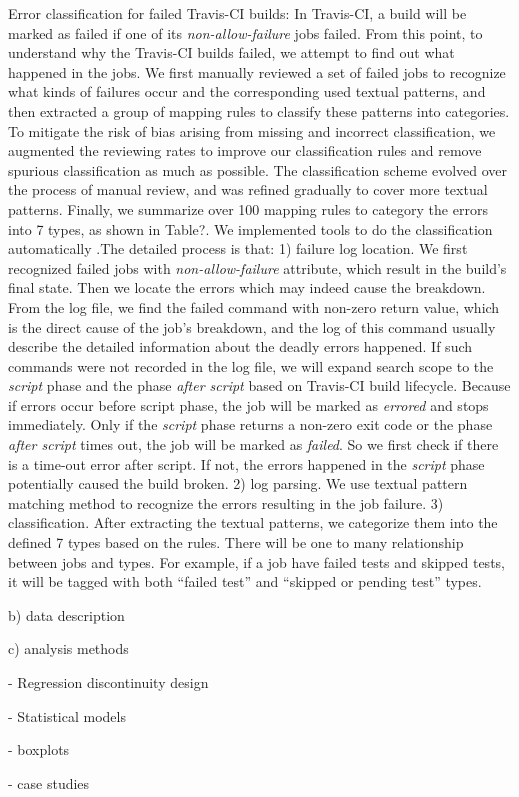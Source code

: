 Error classification for failed Travis-CI builds: 
In Travis-CI, a build will be marked as failed if one of its \textit{non-allow-failure} jobs failed. From this point, to understand why the Travis-CI builds failed, we attempt to find out what happened in the jobs. We first manually reviewed a set of failed jobs to recognize what kinds of failures occur and the corresponding used textual patterns, and then extracted a group of mapping rules to classify these patterns into categories. To mitigate the risk of bias arising from missing and incorrect classification, we augmented the reviewing rates to improve our classification rules and remove spurious classification as much as possible. The classification scheme evolved over the process of manual review, and was refined gradually to cover more textual patterns. Finally, we summarize over 100 mapping rules to category the errors into 7 types, as shown in Table?. 
We implemented tools to do the classification automatically .The detailed process is that: 1) failure log location. We first recognized failed jobs with \textit{non-allow-failure} attribute, which result in the build's final state. Then we locate the errors which may indeed cause the breakdown. From the log file, we find the failed command with non-zero return value, which is the direct cause of the job’s breakdown, and the log of this command usually describe the detailed information about the deadly errors happened. If such commands were not recorded in the log file, we will expand search scope to the \textit{script} phase and the phase \textit{after script} based on Travis-CI build lifecycle. Because if errors occur before script phase, the job will be marked as \textit{errored} and stops immediately. Only if the \textit{script} phase returns a non-zero exit code or the phase \textit{after script} times out, the job will be marked as \textit{failed}. So we first check if there is a time-out error after script. If not, the errors happened in the \textit{script} phase potentially caused the build broken. 2) log parsing. We use textual pattern matching method to recognize the errors resulting in the job failure. 3) classification. After extracting the textual patterns, we categorize them  into the defined 7 types based on the rules. There will be one to many relationship between jobs and types. For example, if a job have failed tests and skipped tests, it will be tagged with both “failed test” and “skipped or pending test” types.


b) data description

c) analysis methods

- Regression discontinuity design




- Statistical models

- boxplots

- case studies